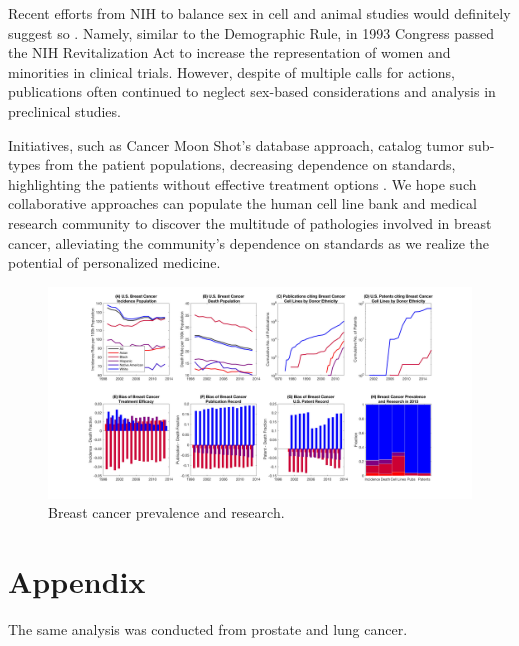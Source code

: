 \documentclass[10pt]{article}
\begin{document}
\begin{multicols}{2}
Recent efforts from NIH to balance sex in cell and animal studies would definitely suggest so \cite{clayton2014nih}. Namely, similar to the Demographic Rule, in 1993 Congress passed the NIH Revitalization Act to increase the representation of women and minorities in clinical trials. However, despite of multiple calls for actions, publications often continued to neglect sex-based considerations and analysis in preclinical studies.

Initiatives, such as Cancer Moon Shot's database approach, catalog tumor sub-types from the patient populations, decreasing dependence on standards, highlighting the patients without effective treatment options \cite{lowy2016cancer}. We hope such collaborative approaches can populate the human cell line bank and medical research community to discover the multitude of pathologies involved in breast cancer, alleviating the community's dependence on standards as we realize the potential of personalized medicine.  
 
\end{multicols}

\begin{figure}[h!]
\centering
\includegraphics[width=1\columnwidth, trim = {30cm 10cm 30cm 5cm}, clip]{Figures/BreastComposite.jpg}
\caption{\label{PS2} Breast cancer prevalence and research.}
\end{figure}
 



\section{Appendix}
The same analysis was conducted from prostate and lung cancer. 
\end{document}
